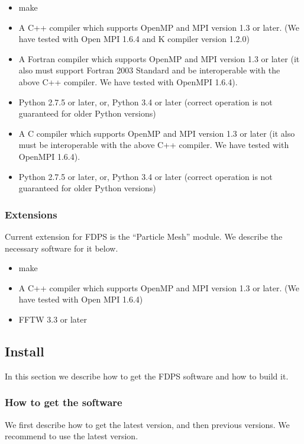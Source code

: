 \begin{itemize}
\item make
\item A C++ compiler which supports OpenMP and MPI version 1.3 or later. (We have tested with Open MPI 1.6.4 and K compiler version 1.2.0)
\ifFtn %
\item A Fortran compiler which supports OpenMP and MPI version 1.3 or later (it also must support Fortran 2003 Standard and be interoperable with the above C++ compiler. We have tested with OpenMPI 1.6.4).
\item Python 2.7.5 or later, or, Python 3.4 or later (correct operation is not guaranteed for older Python versions)
\endifFtn
\ifC %
\item A C compiler which supports OpenMP and MPI version 1.3 or later (it also must be interoperable with the above C++ compiler. We have tested with OpenMPI 1.6.4).
\item Python 2.7.5 or later, or, Python 3.4 or later (correct operation is not guaranteed for older Python versions)
\endifC
\end{itemize}

\subsubsection{Extensions}
Current extension for FDPS is the ``Particle Mesh'' module.  We describe the necessary software for it below.

\begin{itemize}
\item make
\item A C++ compiler which supports OpenMP and MPI version 1.3 or later. (We have tested with Open MPI 1.6.4)
\item FFTW 3.3 or later
\end{itemize}

\subsection{Install}
In this section we describe how to get the FDPS software and how to build it.

\subsubsection{How to get the software}
We first describe how to get the latest version, and then previous versions. We recommend to use the latest version.

